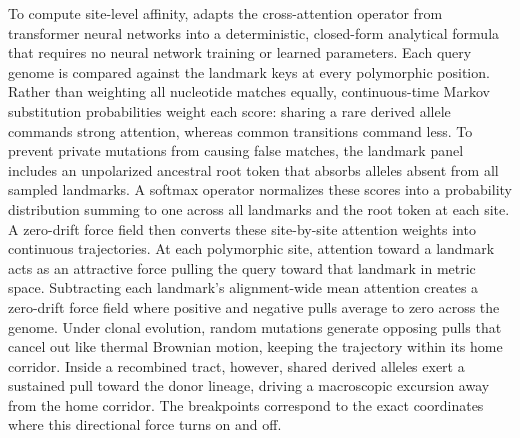 To compute site-level affinity, \RhizAeon adapts the cross-attention operator from transformer neural networks into a deterministic, closed-form analytical formula that requires no neural network training or learned parameters. Each query genome is compared against the landmark keys at every polymorphic position. Rather than weighting all nucleotide matches equally, continuous-time Markov substitution probabilities weight each score: sharing a rare derived allele commands strong attention, whereas common transitions command less. To prevent private mutations from causing false matches, the landmark panel includes an unpolarized ancestral root token that absorbs alleles absent from all sampled landmarks. A softmax operator normalizes these scores into a probability distribution summing to one across all landmarks and the root token at each site. A zero-drift force field then converts these site-by-site attention weights into continuous trajectories. At each polymorphic site, attention toward a landmark acts as an attractive force pulling the query toward that landmark in metric space. Subtracting each landmark's alignment-wide mean attention creates a zero-drift force field where positive and negative pulls average to zero across the genome. Under clonal evolution, random mutations generate opposing pulls that cancel out like thermal Brownian motion, keeping the trajectory within its home corridor. Inside a recombined tract, however, shared derived alleles exert a sustained pull toward the donor lineage, driving a macroscopic excursion away from the home corridor. The breakpoints correspond to the exact coordinates where this directional force turns on and off.


